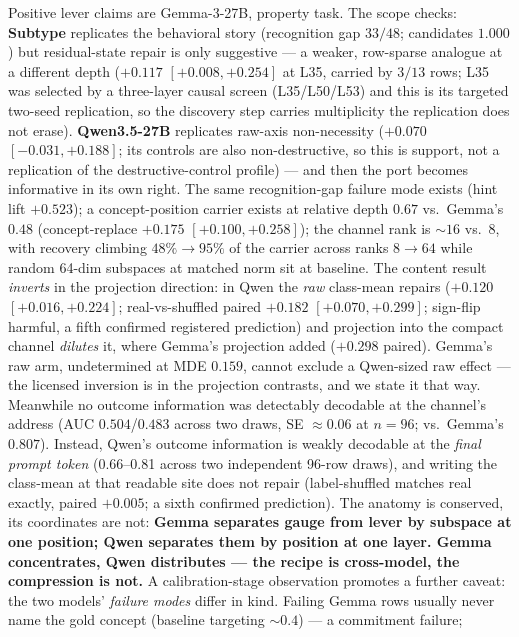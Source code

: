 \documentclass{article} %
\begin{document}
Positive lever claims are Gemma-3-27B, property task. The scope checks:
\textbf{Subtype} replicates the behavioral story (recognition gap
$33/48$; candidates $1.000$) but residual-state repair is only
suggestive --- a weaker, row-sparse analogue at a different depth
($+0.117$ $[+0.008,+0.254]$ at L35, carried by $3/13$ rows; L35 was
selected by a three-layer causal screen (L35/L50/L53) and this is its
targeted two-seed replication, so the discovery step carries
multiplicity the replication does not erase).
\textbf{Qwen3.5-27B} replicates raw-axis non-necessity ($+0.070$
$[-0.031,+0.188]$; its controls are also non-destructive, so this is
support, not a replication of the destructive-control profile) --- and
then the port becomes informative in its own right. The same
recognition-gap failure mode exists (hint lift $+0.523$); a
concept-position carrier exists at relative depth $0.67$ vs.\ Gemma's
$0.48$ (concept-replace $+0.175$ $[+0.100,+0.258]$); the channel rank
is ${\sim}16$ vs.\ $8$, with recovery climbing $48\%\!\to\!95\%$ of
the carrier across ranks $8\!\to\!64$ while random 64-dim subspaces at
matched norm sit at baseline. The content result \emph{inverts} in
the projection direction: in
Qwen the \emph{raw} class-mean repairs ($+0.120$ $[+0.016,+0.224]$;
real-vs-shuffled paired $+0.182$ $[+0.070,+0.299]$; sign-flip harmful,
a fifth confirmed registered prediction) and projection into the
compact channel \emph{dilutes} it, where Gemma's projection added
($+0.298$ paired). Gemma's raw arm, undetermined at MDE $0.159$,
cannot exclude a Qwen-sized raw effect --- the licensed inversion is
in the projection contrasts, and we state it that way. Meanwhile no
outcome information was detectably
decodable at the channel's address (AUC $0.504$/$0.483$ across two
draws, SE ${\approx}0.06$ at $n{=}96$; vs.\
Gemma's $0.807$). Instead, Qwen's outcome information is weakly
decodable at the \emph{final prompt token} (0.66--0.81 across two
independent 96-row draws), and writing the class-mean at that readable
site does not repair (label-shuffled matches real exactly, paired
$+0.005$; a sixth confirmed prediction). The anatomy is conserved,
its coordinates are not: \textbf{Gemma separates gauge from lever by
subspace at one position; Qwen separates them by position at one
layer. Gemma concentrates, Qwen distributes --- the recipe is
cross-model, the compression is not.} A calibration-stage observation
promotes a further caveat: the two models' \emph{failure modes}
differ in kind. Failing Gemma rows usually never name the gold
concept (baseline targeting ${\sim}0.4$) --- a commitment failure;
\end{document}
